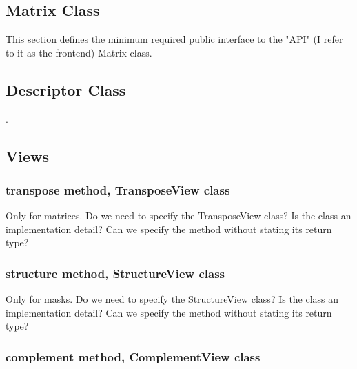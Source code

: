 

\subsection{Matrix Class}

This section defines the minimum required public interface to the "API" (I refer to it
as the frontend) Matrix class.  

\subsection{Descriptor Class}

.

\subsection{Views}

\subsubsection{transpose method, TransposeView class}

Only for matrices.  Do we need to specify the TransposeView class?
Is the class an implementation detail?  Can we specify the method without stating its return type?


\subsubsection{structure method, StructureView class}

Only for masks.  Do we need to specify the StructureView class?
Is the class an implementation detail?  Can we specify the method without stating its return type?


\subsubsection{complement method, ComplementView class}

